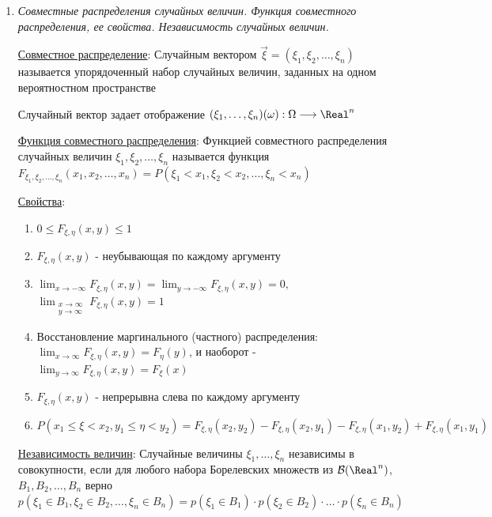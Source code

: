 \documentclass[12pt]{article}
\begin{document}
\begin{enumerate}
    \hyperlink{lawofbignumberskolmogorov}{ЗБЧ Колмогорова}: В условиях теоремы Хинчина $\frac{\xi_1 + \dots + \xi_n}{n} \overset{\text{п.н.}}{\longrightarrow} E\xi_1$

    \item \textit{Совместные распределения случайных величин. Функция совместного распределения, ее свойства. Независимость случайных величин.}
    
    \hyperlink{jointdistribution}{Совместное распределение}: Случайным вектором $\vec{\xi} = (\xi_1, \xi_2, \dots, \xi_n)$ называется упорядоченный набор случайных величин, заданных
    на одном вероятностном пространстве

    Случайный вектор задает отображение $(\xi_1, \dots, \xi_n) (\omega) : \Omega \longrightarrow \Real^n$

    \hyperlink{jointdistributionfunction}{Функция совместного распределения}: Функцией совместного распределения случайных величин $\xi_1, \xi_2, \dots, \xi_n$ называется функция 
    $F_{\xi_1, \xi_2, \dots, \xi_n}(x_1, x_2, \dots, x_n) = P(\xi_1 < x_1, \xi_2 < x_2, \dots, \xi_n < x_n)$

    \hyperlink{jointdistributionfunctionproperties}{Свойства}: 

    \begin{enumerate}
        \item $0 \leq F_{\xi, \eta}(x, y) \leq 1$
        \item $F_{\xi, \eta}(x, y)$ - неубывающая по каждому аргументу
        \item $\lim_{x \to -\infty} F_{\xi, \eta}(x, y) = \lim_{y \to -\infty} F_{\xi, \eta}(x, y) = 0, $
        $\lim_{\substack{x \to \infty \\ y \to \infty}} F_{\xi, \eta}(x, y) = 1$

        \item Восстановление маргинального (частного) распределения: 
        $\lim_{x \to \infty} F_{\xi, \eta}(x, y) = F_\eta(y)$, и наоборот - $\lim_{y \to \infty} F_{\xi, \eta}(x, y) = F_\xi(x)$

        \item $F_{\xi, \eta}(x, y)$ - непрерывна слева по каждому аргументу

        \item $P(x_1 \leq \xi < x_2, y_1 \leq \eta < y_2) = F_{\xi, \eta}(x_2, y_2) - F_{\xi, \eta}(x_2, y_1) - F_{\xi, \eta}(x_1, y_2) + F_{\xi, \eta}(x_1, y_1)$
    \end{enumerate}

    \hyperlink{randomvariablesindependence}{Независимость величин}: Случайные величины $\xi_1, \dots, \xi_n$ независимы в совокупности, если для любого набора Борелевских множеств из
    $\mathcal{B}(\Real^n)$, $B_1, B_2, \dots, B_n$ верно $p(\xi_1 \in B_1, \xi_2 \in B_2, \dots, \xi_n \in B_n) = p(\xi_1 \in B_1) \cdot p(\xi_2 \in B_2) \cdot \dots \cdot p(\xi_n \in B_n)$


\end{enumerate}
\end{document}
